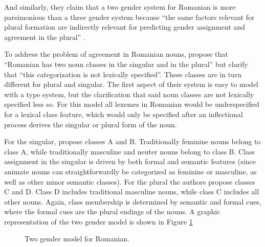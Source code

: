 And similarly, they claim that a two gender system for Romanian is more parsimonious than a three gender system because ``the same factors relevant for plural formation are indirectly relevant for predicting gender assignment and agreement in the plural'' \autocite[p. 45]{Bateman.2010}.

To address the problem of agreement in Romanian nouns, \textcite[p. 52]{Bateman.2010} propose that ``Romanian has two noun classes in the singular and in the plural'' but clarify that ``this categorization is not lexically specified''. These classes are in turn different for plural and singular. The first aspect of their system is easy to model with a type system, but the clarification that said noun classes are not lexically specified less so. For this model all lexemes in Romanian would be underspecified for a lexical class feature, which would only be specified after an inflectional process derives the singular or plural form of the noun.

For the singular, \textcite{Bateman.2010} propose classes A and B. Traditionally feminine nouns belong to class A, while traditionally masculine and neuter nouns belong to class B. Class assignment in the singular is driven by both formal and semantic features (since animate nouns can straightforwardly be categorized as feminine or masculine, as well as other minor semantic classes). For the plural the authors propose classes C and D. Class D includes traditional masculine nouns, while class C includes all other nouns. Again, class membership is determined by semantic and formal cues, where the formal cues are the plural endings of the nouns. A graphic representation of the two gender model is shown in Figure \ref{fig:graphic-two-gender-bateman}

\begin{figure}
    \caption{Two gender model for Romanian.} \label{fig:graphic-two-gender-bateman}
\end{figure}

